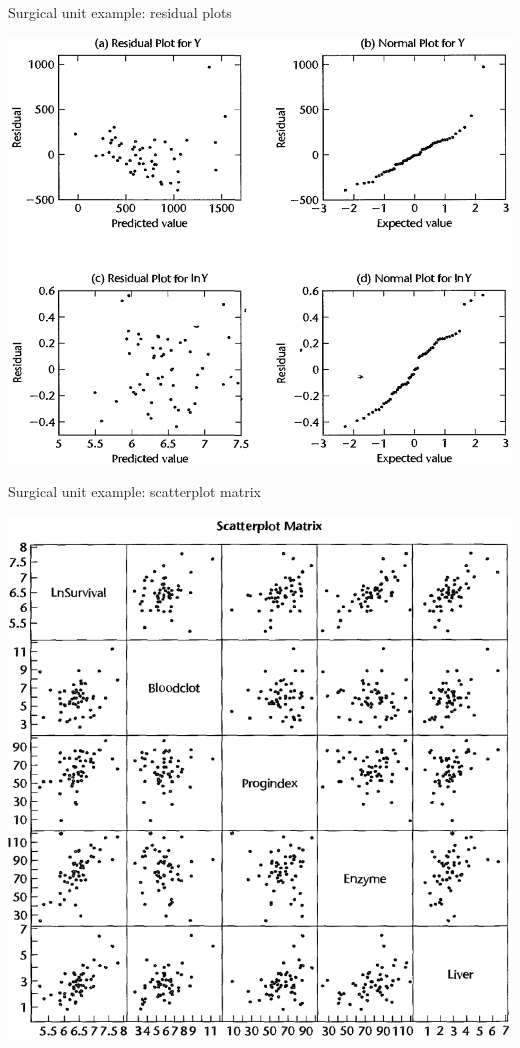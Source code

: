 \documentclass{beamer}
\begin{document}
\begin{frame}{Surgical unit example: residual plots}
\centerline{\includegraphics[scale=0.27]{plots/res-y}}
\end{frame}

\begin{frame}{Surgical unit example: scatterplot matrix}
\centerline{\includegraphics[scale=0.27]{plots/scat-mat}}
\end{frame}
\end{document}
